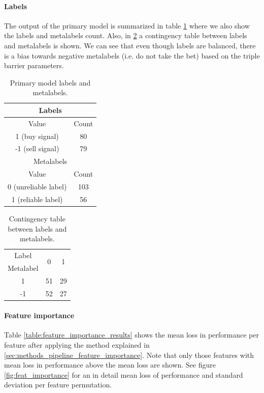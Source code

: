 \paragraph{Labels} The output of the primary model is summarized in table
\ref{table:labels_metalabel} where we also show the labels and metalabels count.
Also, in \ref{table:label_vs_metalabel} a contingency table between 
labels and metalabels is shown. We can see that even though labels are balanced,
there is a bias towards negative metalabels (i.e. do not take the bet) based on
the triple barrier parameters.

\begin{table}[H]
  \centering
  \begin{tabular}{| c | c |} 
    \hline
    \multicolumn{2}{|c|}{Labels}      \\
    \hline
    Value & Count                     \\
    \hline
    1 (buy signal) & 80               \\
    \hline
    -1 (sell signal) & 79             \\
    \hline
    \multicolumn{2}{|c|}{Metalabels}  \\
    \hline
    Value & Count                     \\
    \hline
    0 (unreliable label)     & 103    \\
    \hline
    1 (reliable label)       & 56     \\
    \hline
  \end{tabular}
  \caption{Primary model labels and metalabels.}
  \label{table:labels_metalabel}
\end{table}

\begin{table}[H]
  \centering
  \begin{tabular}{|c|c|c|}
    \hline
    Label     & \multirow{2}{*}{0} & \multirow{2}{*}{1} \\ \cline{1-1}
    Metalabel &                    &                    \\ \hline
    1         & 51                 & 29                 \\ \hline
    -1        & 52                 & 27                 \\ \hline
  \end{tabular}
  \caption{Contingency table between labels and metalabels.}
  \label{table:label_vs_metalabel}
\end{table}

\paragraph{Feature importance} Table \ref{table:feature_importance_results}
shows the mean loss in performance per feature after applying the method explained in
\ref{sec:methods_pipeline_feature_importance}. Note that only those features
with mean loss in performance above the mean loss are shown. See figure
\ref{fig:feat_importance} for an in detail mean loss of performance and standard
deviation per feature permutation.

